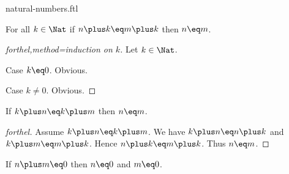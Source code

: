 \documentclass{naproche-library}
\begin{document}
\begin{smodule}{natural-numbers.ftl}
  \begin{proposition}[forthel,title=Right cancellation,id=PlusIsRightCancellativeProp]
    For all $k\in\Nat$ if $n\plus k\eq m\plus k$ then $n\eq m$.
  \end{proposition}
  \begin{proof}[forthel,method=induction on $k$]
    Let $k\in\Nat$.

    Case $k\eq0$. Obvious.

    Case $k\neq0$. Obvious.
  \end{proof}

  \begin{corollary}[forthel,title=Left cancellation,id=PlusIsLeftCancellativeProp]
    If $k\plus n\eq k\plus m$ then $n\eq m$.
  \end{corollary}
  \begin{proof}[forthel]
    Assume $k\plus n\eq k\plus m$.
    We have $k\plus n\eq n\plus k$ and $k\plus m\eq m\plus k$.
    Hence $n\plus k\eq m\plus k$.
    Thus $n\eq m$.
  \end{proof}

  \begin{proposition}[forthel,id=ZeroSumImpliesZeroSummandsProp]
    If $n\plus m\eq0$ then $n\eq0$ and $m\eq0$.
  \end{proposition}
\end{smodule}
\end{document}

